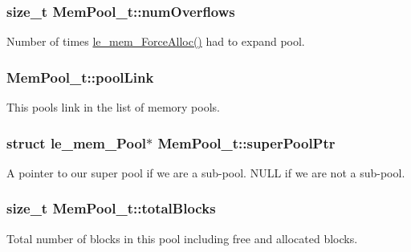 \subsubsection[{\texorpdfstring{num\+Overflows}{numOverflows}}]{\setlength{\rightskip}{0pt plus 5cm}size\+\_\+t Mem\+Pool\+\_\+t\+::num\+Overflows}\hypertarget{struct_mem_pool__t_ac81f3a8d3e3828e17c1bc7b66fe7b9fb}{}\label{struct_mem_pool__t_ac81f3a8d3e3828e17c1bc7b66fe7b9fb}


Number of times \hyperlink{le__mem_8h_af7c289c73d4182835a26a9099f3db359}{le\+\_\+mem\+\_\+\+Force\+Alloc()} had to expand pool. 

\subsubsection[{\texorpdfstring{pool\+Link}{poolLink}}]{ Mem\+Pool\+\_\+t\+::pool\+Link}\hypertarget{struct_mem_pool__t_a69728a565023b742041fc6229b5a48ab}{}\label{struct_mem_pool__t_a69728a565023b742041fc6229b5a48ab}


This pool\textquotesingle{}s link in the list of memory pools. 

\subsubsection[{\texorpdfstring{super\+Pool\+Ptr}{superPoolPtr}}]{\setlength{\rightskip}{0pt plus 5cm}struct le\+\_\+mem\+\_\+\+Pool$\ast$ Mem\+Pool\+\_\+t\+::super\+Pool\+Ptr}\hypertarget{struct_mem_pool__t_a91326c1c23490bd1319507914bf78e1c}{}\label{struct_mem_pool__t_a91326c1c23490bd1319507914bf78e1c}
A pointer to our super pool if we are a sub-\/pool. N\+U\+LL if we are not a sub-\/pool. 
\subsubsection[{\texorpdfstring{total\+Blocks}{totalBlocks}}]{\setlength{\rightskip}{0pt plus 5cm}size\+\_\+t Mem\+Pool\+\_\+t\+::total\+Blocks}\hypertarget{struct_mem_pool__t_aae323b1a482e692b631de24ce93815e6}{}\label{struct_mem_pool__t_aae323b1a482e692b631de24ce93815e6}
Total number of blocks in this pool including free and allocated blocks. 
